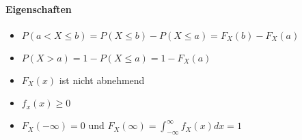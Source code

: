 \documentclass{article}
\begin{document}
\paragraph{Eigenschaften}
\begin{itemize}
\item $P(a < X \leq b) = P(X\le b) - P(X \le a) = F_X (b) - F_X(a)$
\item $P(X > a) = 1-P(X \le a) = 1- F_X(a)$
\item $F_X(x) $ ist nicht abnehmend
\item$ f_x(x) \ge 0 $
 \item $F_X (-\infty) = 0$ und $ F_X(\infty) = \int_{-\infty}^\infty f_X(x) dx =1$


\end{itemize}
\end{document}
